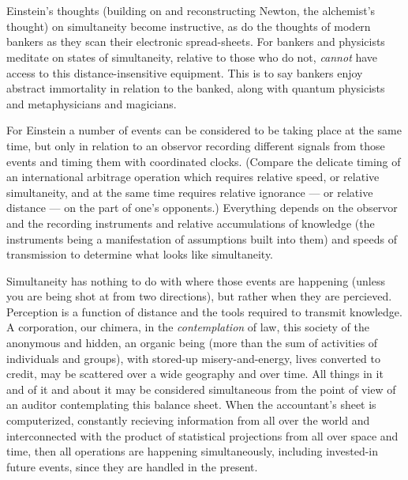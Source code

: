 \chapter{}

Einstein's thoughts (building on and reconstructing Newton, the alchemist's thought)
on simultaneity become instructive, as do
the thoughts of modern bankers as they scan
their electronic spread-sheets. For bankers
and physicists meditate on states of simultaneity, relative to those who do not, \emph{cannot}
have access to this distance-insensitive equipment. This is to say bankers enjoy abstract
immortality in relation to the banked, along
with quantum physicists and metaphysicians
and magicians.

For Einstein a number of events can be
considered to be taking place at the same
time, but only in relation to an observor
recording different signals from those events
and timing them with coordinated clocks.
(Compare the delicate timing of an international
arbitrage operation which requires relative speed, or relative simultaneity, and
at the same time requires relative ignorance ---
or relative distance --- on the part of one's opponents.) Everything depends on the observor and the recording instruments and
relative accumulations of knowledge (the instruments being a manifestation of assumptions built into them) and speeds of transmission to determine what looks like simultaneity.

Simultaneity has nothing to do with where
those events are happening (unless you are
being shot at from two directions), but rather
when they are percieved. Perception is a
function of distance and the tools required to
transmit knowledge. A corporation, our
chimera, in the \emph{contemplation} of law, this
society of the anonymous and hidden, an
organic being (more than the sum of activities of individuals and groups), with
stored-up misery-and-energy, lives converted
to credit, may be scattered over a wide
geography and over time. All things in it and
of it and about it may be considered simultaneous from the point of view of an auditor
contemplating this balance sheet.
When the accountant's sheet is computerized, constantly recieving information from all over
the world and interconnected with the product of statistical projections from all over
space and time, then all operations are happening simultaneously, including invested-in future events, since they are handled in the present.

